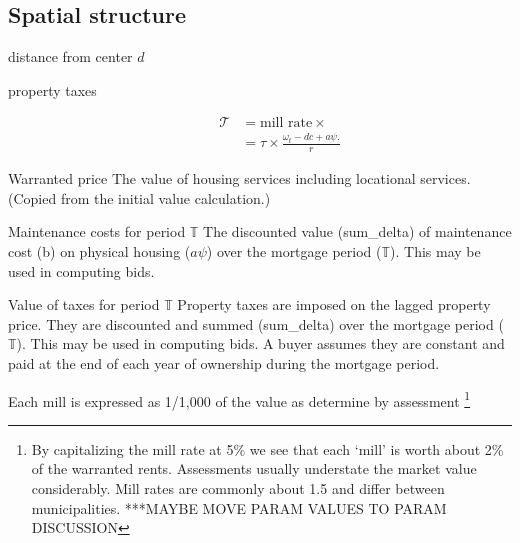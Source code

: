  
\subsection{Spatial structure}

\begin{description}
\item[distance from center  $d$] 
\end{description}


\begin{description}
\item[property taxes]
\begin{align*}
\mathcal{T} &= \text{mill rate} \times  \\
&= \tau \times \frac{\omega_t- {dc} + a\psi.}{r}
\end{align*}
\end{description}



{Warranted price} The value of housing services including locational services. (Copied from the initial value calculation.)

{Maintenance costs for period $\mathbb{T}$} The discounted value (sum\_delta) of maintenance cost (b) on  physical housing ($a\psi$) over the mortgage period ($\mathbb{T}$). This may be used in computing bids.

{Value of taxes for period $\mathbb{T}$}
Property taxes are imposed on the  lagged property price. They  are discounted and summed (sum\_delta)  over the mortgage period ($\mathbb{T}$). This may be used in computing bids. A buyer assumes they are constant and paid at the end of each year of ownership during the mortgage period.

Each mill is expressed as  1/1,000 of the value as determine by assessment \footnote{By capitalizing the mill rate at 5\%  we see that each `mill' is worth about 2\% of the warranted rents. Assessments usually understate the market value considerably. Mill rates are commonly about 1.5 and differ between municipalities. ***MAYBE MOVE PARAM VALUES TO PARAM DISCUSSION}


